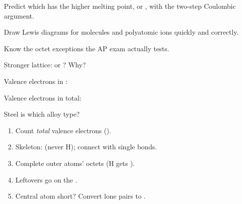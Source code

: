 \documentclass{apchem-notes}
\begin{document}
\begin{exitticket}
Predict which has the higher melting point,  or , with the
two-step Coulombic argument. 
\end{exitticket}


\begin{objectives}
  \item Draw Lewis diagrams for molecules and polyatomic ions quickly and
        correctly.
  \item Know the octet exceptions the AP exam actually tests.
\end{objectives}


\begin{warmup}[4]
  \item Stronger lattice:  or ? Why?
  \item Valence electrons in : 
  \item Valence electrons in  total:
  \item Steel is which alloy type? 
\end{warmup}



\begin{enumerate}[leftmargin=*,itemsep=0.2em]
  \item Count \emph{total} valence electrons
        ().
  \item Skeleton: 
        (never H); connect with single bonds.
  \item Complete outer atoms' octets (H gets ).
  \item Leftovers go on the .
  \item Central atom short? Convert lone pairs to
        .
\end{enumerate}
\end{document}
